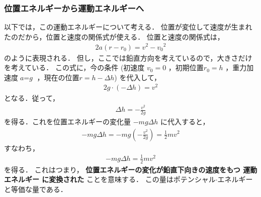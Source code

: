             \subsubsection{位置エネルギーから運動エネルギーへ}
                以下では，この運動エネルギーについて考える．
                位置が変位して速度が生まれたのだから，位置と速度の関係式が使える．
                位置と速度の関係式は，
                    \begin{align}
                        2\textit{a}\left(\textit{r}-\textit{r}_{0}\right)
                        =\textit{v}^{2}-{\textit{v}_{0}}^{2}
                    \end{align}
                のように表現される．
                但し，ここでは鉛直方向を考えているので，大きさだけを考えている．
                この式に，今の条件
                (初速度 $\textit{v}_{0}=0$ ，初期位置$\textit{r}_{0}=h$
                ，重力加速度$\textit{a}=\textit{g}$ ，現在の位置$r=h-\Delta h$)
                を代入して，
                    \begin{align}
                        2\textit{g}\cdot\left(-\Delta h\right)
                        =\textit{v}^{2}
                    \end{align}
                となる．従って，
                    \begin{align}
                        \Delta h = -\frac{\textit{v}^{2}}{2g}
                    \end{align}
                を得る．これを位置エネルギーの変化量 $-mg\Delta h$ に代入すると，
                    \begin{align*}
                        -mg\Delta h =- mg\left(-\frac{\textit{v}^{2}}{2g}\right) = \frac{1}{2} m {\textit{v}^{2}}
                    \end{align*}
                すなわち，
                    \begin{align}
                        -mg\Delta h = \frac{1}{2} m {\textit{v}^{2}}
                    \end{align}
                を得る．
                これはつまり，
                            \textbf{
                            位置エネルギーの変化が鉛直下向きの速度をもつ 運動エネルギー に変換された
                            }ことを意味する．
                この量はポテンシャル$\cdot$エネルギーと等価な量である．

